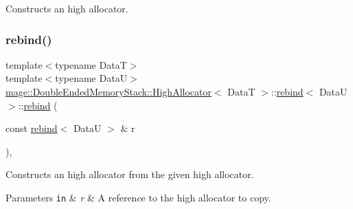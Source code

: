 Constructs an high allocator. \hypertarget{structmage_1_1_double_ended_memory_stack_1_1_high_allocator_1_1rebind_ae66cf8819a74c5c874b7e13df7ddd9f9}{}\label{structmage_1_1_double_ended_memory_stack_1_1_high_allocator_1_1rebind_ae66cf8819a74c5c874b7e13df7ddd9f9} 
\subsubsection{\texorpdfstring{rebind()}{rebind()}\hspace{0.1cm}{\footnotesize\ttfamily [2/3]}}
{\footnotesize\ttfamily template$<$typename DataT$>$ \\
template$<$typename DataU$>$ \\
\hyperlink{structmage_1_1_double_ended_memory_stack_1_1_high_allocator}{mage\+::\+Double\+Ended\+Memory\+Stack\+::\+High\+Allocator}$<$ DataT $>$\+::\hyperlink{structmage_1_1_double_ended_memory_stack_1_1_high_allocator_1_1rebind}{rebind}$<$ DataU $>$\+::\hyperlink{structmage_1_1_double_ended_memory_stack_1_1_high_allocator_1_1rebind}{rebind} (\begin{DoxyParamCaption}\item[{const \hyperlink{structmage_1_1_double_ended_memory_stack_1_1_high_allocator_1_1rebind}{rebind}$<$ DataU $>$ \&}]{r }\end{DoxyParamCaption})\hspace{0.3cm}{\ttfamily [private]}, {\ttfamily [delete]}}

Constructs an high allocator from the given high allocator.


\begin{DoxyParams}[1]{Parameters}
\mbox{\tt in}  & {\em r} & A reference to the high allocator to copy. \\
\hline
\end{DoxyParams}
\hypertarget{structmage_1_1_double_ended_memory_stack_1_1_high_allocator_1_1rebind_a282a02984b0c2600e66dee32f9839cf9}{}\label{structmage_1_1_double_ended_memory_stack_1_1_high_allocator_1_1rebind_a282a02984b0c2600e66dee32f9839cf9} 

